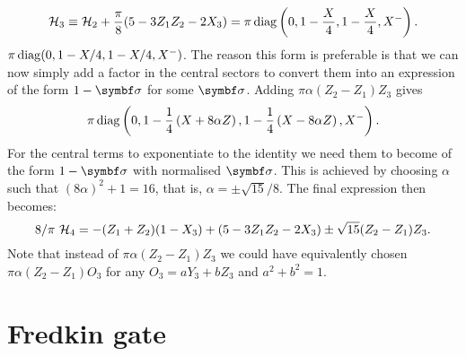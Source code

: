 \begin{equation}
    {\mathcal{H}}_3 \equiv {\mathcal{H}}_2 + \frac{\pi}{8}(5 - 3Z_1Z_2 - 2X_3)
    = \pi\operatorname{diag}\left(0, 1- \frac{X}{4}, 1- \frac{X}{4}, X^-\right). 
\end{equation}
$\pi \operatorname{diag}(0, 1 - X/4, 1 - X/4, X^-)$.
The reason this form is preferable is that we can now simply add a factor in the central sectors to convert them into an expression of the form $1 - \bs\sigma$ for some $\bs\sigma$.
Adding $\pi \alpha (Z_2 - Z_1)Z_3$ gives
\begin{equation}
	\pi\operatorname{diag}\left(
        0,
        1 - \frac14\left(X + 8\alpha Z\right),
        1 - \frac14\left(X - 8\alpha Z\right),
        X^-
    \right).
\end{equation}
For the central terms to exponentiate to the identity we need them to become of the form $1-\bs\sigma$ with normalised $\bs\sigma$.
This is achieved by choosing $\alpha$ such that $(8\alpha)^2+1=16$, that is, $\alpha=\pm\sqrt{15}/8$.
The final expression then becomes:
\begin{equation}
	8/\pi \,\, {\mathcal{H}}_4 = -(Z_1 + Z_2)(1 - X_3)
        + (5 - 3Z_1Z_2 - 2 X_3)
        \pm \sqrt{15} (Z_2 - Z_1)Z_3.
\end{equation}
Note that instead of $\pi \alpha (Z_2 - Z_1)Z_3$ we could have equivalently chosen
$\pi\alpha(Z_2-Z_1)O_3$ for any $O_3 = a Y_3 + b Z_3$ and $a^2 + b^2 = 1$.


\section{Fredkin gate}
\label{sec:GL:fredkin}

